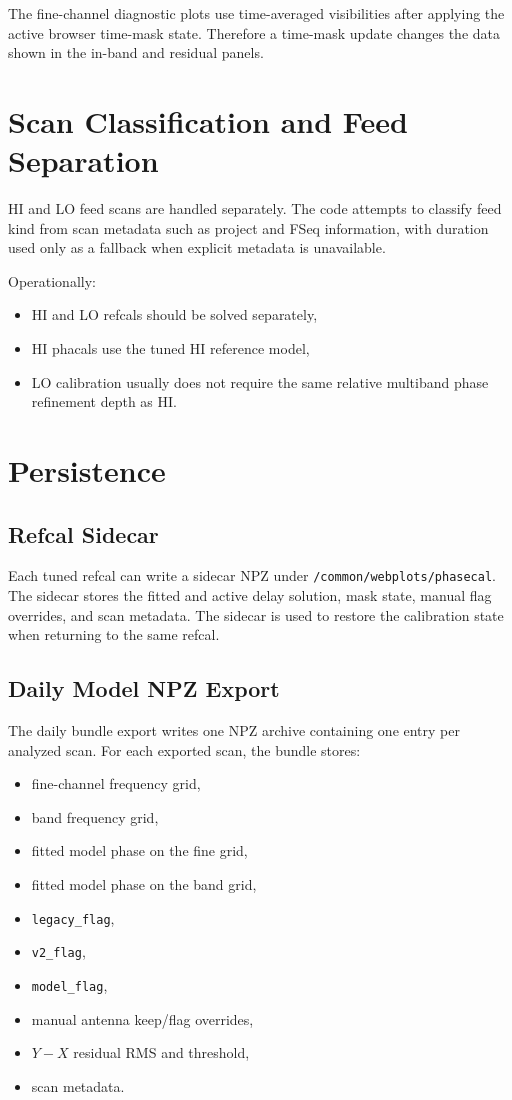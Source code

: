 \documentclass[11pt]{article}
\begin{document}
The fine-channel diagnostic plots use time-averaged visibilities after applying
the active browser time-mask state. Therefore a time-mask update changes the
data shown in the in-band and residual panels.

\section{Scan Classification and Feed Separation}

HI and LO feed scans are handled separately. The code attempts to classify feed
kind from scan metadata such as project and FSeq information, with duration used
only as a fallback when explicit metadata is unavailable.

Operationally:
\begin{itemize}[leftmargin=1.5em]
  \item HI and LO refcals should be solved separately,
  \item HI phacals use the tuned HI reference model,
  \item LO calibration usually does not require the same relative multiband
  phase refinement depth as HI.
\end{itemize}

\section{Persistence}

\subsection{Refcal Sidecar}

Each tuned refcal can write a sidecar NPZ under
\texttt{/common/webplots/phasecal}. The sidecar stores the fitted and active
delay solution, mask state, manual flag overrides, and scan metadata. The
sidecar is used to restore the calibration state when returning to the same
refcal.

\subsection{Daily Model NPZ Export}

The daily bundle export writes one NPZ archive containing one entry per analyzed
scan. For each exported scan, the bundle stores:
\begin{itemize}[leftmargin=1.5em]
  \item fine-channel frequency grid,
  \item band frequency grid,
  \item fitted model phase on the fine grid,
  \item fitted model phase on the band grid,
  \item \texttt{legacy\_flag},
  \item \texttt{v2\_flag},
  \item \texttt{model\_flag},
  \item manual antenna keep/flag overrides,
  \item $Y-X$ residual RMS and threshold,
  \item scan metadata.
\end{itemize}
\end{document}
